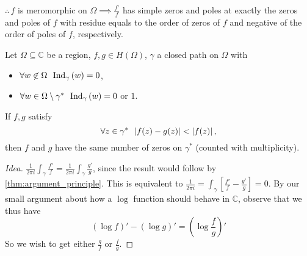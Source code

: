 \documentclass[notoc,notitlepage]{tufte-book}
\begin{document}
$\therefore \, f$ is meromorphic on $\Omega \implies \frac{f'}{f}$ has simple zeros and poles at exactly the zeros and poles of $f$ with residue equals to the order of zeros of $f$ and negative of the order of poles of $f$, respectively.

\begin{thm}\label{thm:rouche_s_theorem}
  Let $\Omega \subseteq \mathbb{C}$ be a region, $f, g \in H(\Omega)$, $\gamma$ a closed path on $\Omega$ with
  \begin{itemize}
    \item $\forall w \not\in \Omega \enspace \operatorname{Ind}_{\gamma}\left( w \right) = 0$,
    \item $\forall w \in \Omega \setminus \gamma^* \enspace \operatorname{Ind}_{\gamma}\left( w \right) = 0$ or $1$.
  \end{itemize}
  If $f, g$ satisfy
  \begin{equation*}
    \forall z \in \gamma^* \enspace \left|f(z) - g(z)\right| < \left|f(z)\right|,
  \end{equation*}
  then $f$ and $g$ have the same number of zeros on $\gamma^*$ (counted with multiplicity).
\end{thm}

\begin{proof}[Idea]
   $\frac{1}{2 \pi i} \int_{\gamma} \frac{f'}{f} = \frac{1}{2 \pi i} \int_{\gamma} \frac{g'}{g}$, since the result would follow by \cref{thm:argument_principle}. This is equivalent to $\frac{1}{2 \pi i} = \int_{\gamma} \left[ \frac{f'}{f} - \frac{g'}{g} \right] = 0$. By our small argument about how a $\log$ function should behave in $\mathbb{C}$, observe that we thus have
  \begin{equation*}
    \left( \log f \right)' - \left( \log g \right)' = \left( \log \frac{f}{g} \right)'
  \end{equation*}
  So we wish to get either $\frac{g}{f}$ or $\frac{f}{g}$.
\end{proof}
\end{document}

